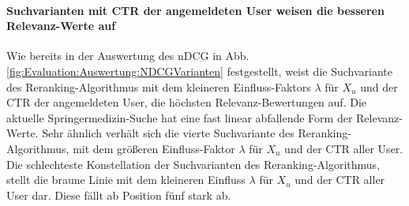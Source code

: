 \paragraph{Suchvarianten mit CTR der angemeldeten User weisen die besseren Relevanz-Werte auf}
Wie bereits in der Auswertung des nDCG in Abb. \ref{fig:Evaluation:Auswertung:NDCGVarianten} festgestellt, weist die Suchvariante des Reranking-Algorithmus mit dem kleineren Einfluss-Faktors $\lambda$ für $X_u$ und der CTR der angemeldeten User, die höchsten Relevanz-Bewertungen auf. Die aktuelle Springermedizin-Suche hat eine fast linear abfallende Form der Relevanz-Werte. Sehr ähnlich verhält sich die vierte Suchvariante des Reranking-Algorithmus, mit dem größeren Einfluss-Faktor $\lambda$ für $X_u$ und der CTR aller User. Die schlechteste Konstellation der Suchvarianten des Reranking-Algorithmus, stellt die braune Linie mit dem kleineren Einfluss $\lambda$ für $X_u$ und der CTR aller User dar. Diese fällt ab Position fünf stark ab.